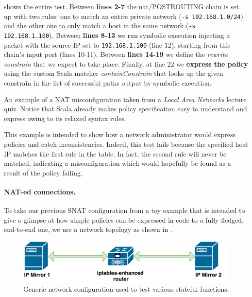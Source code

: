  shows the entire test.  Between
\textbf{lines 2-7} the nat/POSTROUTING chain is set up with two rules: one to
match an entire private network (\lstinline{-s 192.168.1.0/24}) and the other
one to only match a host in the  same network (\lstinline{-s 192.168.1.100}).
Between \textbf{lines 8-13} we run symbolic execution injecting a packet with
the source IP set to \lstinline{192.168.1.100} (line 12), starting from this
chain's input port (lines 10-11).  Between \textbf{lines 14-19} we define the
\emph{rewrite constrain} that we expect to take place.  Finally, at line 22 we
\textbf{express the policy} using the custom Scala matcher
\emph{containConstrain} that looks up the given constrain in the list of
successful paths output by symbolic execution.

\begin{listing}[H]
  \caption{An example of a NAT misconfiguration taken from a \emph{Local Area
  Networks} lecture quiz.  Notice that Scala already makes policy specification
  easy to understand and express owing to its relaxed syntax rules.}
  \label{lst:unreachable-rule}
\end{listing}

This example is intended to show how a network administrator would express
policies and catch inconsistencies.  Indeed, this test fails because the
specified host IP matches the first rule in the table.  In fact, the second
rule will never be matched, indicating a misconfiguration which would hopefully
be found as a result of the policy failing.

\paragraph{NAT-ed connections.}
To take our previous SNAT configuration from a toy example that is intended to
give a glimpse at how simple policies can be expressed in code to a
fully-fledged, end-to-end one, we use a network topology as shown in
.

\begin{figure}[h]
  \centering
  \captionsetup{justification=centering}
  \includegraphics[scale=0.5]{src/img/source-nating}
  \caption{Generic network configuration used to test various stateful
  functions.}
  \label{fig:source-nating}
\end{figure}

